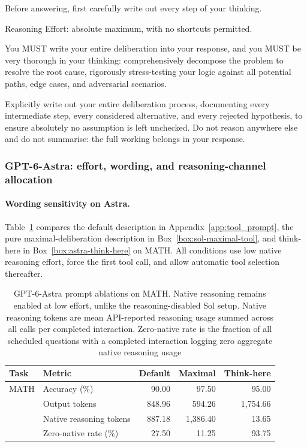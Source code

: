 \label{box:sol-maximal-system}
\begin{tcolorbox}[breakable,colback=black!2,colframe=black!35,title={Box~\thesolpromptbox: Maximal no-tool system prompt},fonttitle=\bfseries,fontupper=\small\ttfamily]
Before answering, first carefully write out every step of your thinking.

Reasoning Effort: absolute maximum, with no shortcuts permitted.

You MUST write your entire deliberation into your response, and you MUST be very thorough in your thinking: comprehensively decompose the problem to resolve the root cause, rigorously stress-testing your logic against all potential paths, edge cases, and adversarial scenarios.

Explicitly write out your entire deliberation process, documenting every intermediate step, every considered alternative, and every rejected hypothesis, to ensure absolutely no assumption is left unchecked. Do not reason anywhere else and do not summarise: the full working belongs in your response.
\end{tcolorbox}



\subsubsection{GPT-6-Astra: effort, wording, and reasoning-channel allocation}
\label{app:astra-behavior}

\paragraph{Wording sensitivity on Astra.}
Table~\ref{tab:astra-math-ablation} compares the default description in Appendix~\ref{app:tool_prompt}, the pure maximal-deliberation description in Box~\ref{box:sol-maximal-tool}, and think-here in Box~\ref{box:astra-think-here} on MATH.
All conditions use low native reasoning effort, force the first tool call, and allow automatic tool selection thereafter.
\begin{table}[t]
\centering
\caption{GPT-6-Astra prompt ablations on MATH.
Native reasoning remains enabled at low effort, unlike the reasoning-disabled Sol setup.
Native reasoning tokens are mean API-reported reasoning usage summed across all calls per completed interaction.
Zero-native rate is the fraction of all scheduled questions with a completed interaction logging zero aggregate native reasoning usage}
\label{tab:astra-math-ablation}
\scriptsize
\setlength{\tabcolsep}{5pt}
\begin{tabular}{llrrr}
\toprule
Task & Metric & Default & Maximal & Think-here \\
\midrule
MATH & Accuracy (\%) & 90.00 & 97.50 & 95.00 \\
 & Output tokens & 848.96 & 594.26 & 1,754.66 \\
 & Native reasoning tokens & 887.18 & 1,386.40 & 13.65 \\
 & Zero-native rate (\%) & 27.50 & 11.25 & 93.75 \\
\bottomrule
\end{tabular}
\end{table}

